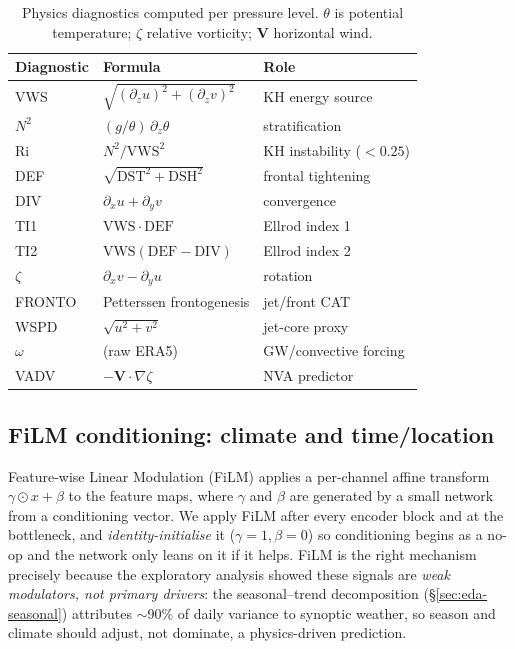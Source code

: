 \documentclass[11pt]{article}
\newcommand{\circnum}[1]{\ding{\the\numexpr181+#1\relax}}
\begin{document}
\begin{table}[H]
\centering\small
\caption{Physics diagnostics computed per pressure level. $\theta$ is
potential temperature; $\zeta$ relative vorticity; $\mathbf{V}$
horizontal wind.}
\label{tab:diag}
\begin{tabular}{@{}lll@{}}
\toprule
Diagnostic & Formula & Role \\
\midrule
VWS & $\sqrt{(\partial_z u)^2+(\partial_z v)^2}$ & KH energy source\\
$N^2$ & $(g/\theta)\,\partial_z\theta$ & stratification \\
Ri & $N^2/\mathrm{VWS}^2$ & KH instability ($<0.25$)\\
DEF & $\sqrt{\mathrm{DST}^2+\mathrm{DSH}^2}$ & frontal tightening\\
DIV & $\partial_x u+\partial_y v$ & convergence \\
TI1 & $\mathrm{VWS}\cdot\mathrm{DEF}$ & Ellrod index 1\\
TI2 & $\mathrm{VWS}(\mathrm{DEF}-\mathrm{DIV})$ & Ellrod index 2\\
$\zeta$ & $\partial_x v-\partial_y u$ & rotation \\
FRONTO & Petterssen frontogenesis & jet/front CAT\\
WSPD & $\sqrt{u^2+v^2}$ & jet-core proxy\\
$\omega$ & (raw ERA5) & GW/convective forcing\\
VADV & $-\mathbf{V}\cdot\nabla\zeta$ & NVA predictor\\
\bottomrule
\end{tabular}
\end{table}

\subsection{\circnum{2} FiLM conditioning: climate and time/location}
\label{sec:arch-film}
Feature-wise Linear Modulation (FiLM) applies a per-channel affine
transform $\gamma\odot x+\beta$ to the feature maps, where $\gamma$ and
$\beta$ are generated by a small network from a conditioning vector. We
apply FiLM after every encoder block and at the bottleneck, and
\emph{identity-initialise} it ($\gamma{=}1,\beta{=}0$) so conditioning
begins as a no-op and the network only leans on it if it helps. FiLM is
the right mechanism precisely because the exploratory analysis showed
these signals are \emph{weak modulators, not primary drivers}: the
seasonal--trend decomposition (\S\ref{sec:eda-seasonal}) attributes
$\sim$90\% of daily variance to synoptic weather, so season and climate
should adjust, not dominate, a physics-driven prediction.
\end{document}
